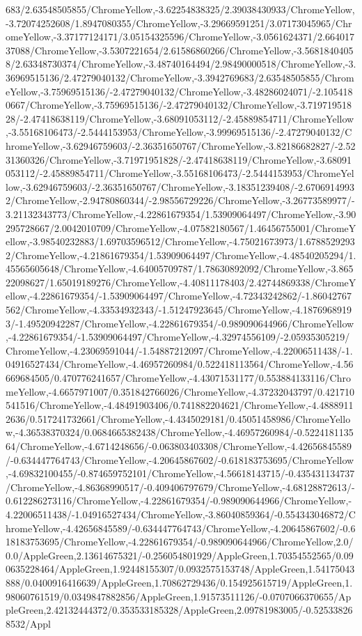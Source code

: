 {\begin{tikzternal}
683/2.63548505855/ChromeYellow,-3.62254838325/2.39038430933/ChromeYellow,-3.72074252608/1.8947080355/ChromeYellow,-3.29669591251/3.07173045965/ChromeYellow,-3.37177124171/3.05154325596/ChromeYellow,-3.0561624371/2.66401737088/ChromeYellow,-3.5307221654/2.61586860266/ChromeYellow,-3.56818404058/2.63348730374/ChromeYellow,-3.48740164494/2.98490000518/ChromeYellow,-3.36969515136/2.47279040132/ChromeYellow,-3.3942769683/2.63548505855/ChromeYellow,-3.75969515136/-2.47279040132/ChromeYellow,-3.48286024071/-2.1054180667/ChromeYellow,-3.75969515136/-2.47279040132/ChromeYellow,-3.71971951828/-2.47418638119/ChromeYellow,-3.68091053112/-2.45889854711/ChromeYellow,-3.55168106473/-2.5444153953/ChromeYellow,-3.99969515136/-2.47279040132/ChromeYellow,-3.62946759603/-2.36351650767/ChromeYellow,-3.82186682827/-2.5231360326/ChromeYellow,-3.71971951828/-2.47418638119/ChromeYellow,-3.68091053112/-2.45889854711/ChromeYellow,-3.55168106473/-2.5444153953/ChromeYellow,-3.62946759603/-2.36351650767/ChromeYellow,-3.18351239408/-2.67069149932/ChromeYellow,-2.94780860344/-2.98556729226/ChromeYellow,-3.26773589977/-3.21132343773/ChromeYellow,-4.22861679354/1.53909064497/ChromeYellow,-3.90295728667/2.0042010709/ChromeYellow,-4.07582180567/1.46456755001/ChromeYellow,-3.98540232883/1.69703596512/ChromeYellow,-4.75021673973/1.67885292932/ChromeYellow,-4.21861679354/1.53909064497/ChromeYellow,-4.48540205294/1.45565605648/ChromeYellow,-4.64005709787/1.78630892092/ChromeYellow,-3.86522098627/1.65019189276/ChromeYellow,-4.40811178403/2.42744869338/ChromeYellow,-4.22861679354/-1.53909064497/ChromeYellow,-4.72343242862/-1.86042767562/ChromeYellow,-4.33534932343/-1.51247923645/ChromeYellow,-4.18769689193/-1.49520942287/ChromeYellow,-4.22861679354/-0.989090644966/ChromeYellow,-4.22861679354/-1.53909064497/ChromeYellow,-4.32974556109/-2.05935305219/ChromeYellow,-4.23069591044/-1.54887212097/ChromeYellow,-4.22006511438/-1.04916527434/ChromeYellow,-4.46957260984/0.522418113564/ChromeYellow,-4.56669684505/0.470776241657/ChromeYellow,-4.43071531177/0.553884133116/ChromeYellow,-4.6657971007/0.351842766026/ChromeYellow,-4.37232043797/0.421710541516/ChromeYellow,-4.48491903406/0.741882204621/ChromeYellow,-4.48889112636/0.517241732661/ChromeYellow,-4.4345029181/0.45051458986/ChromeYellow,-4.36538370324/0.0684665382438/ChromeYellow,-4.46957260984/-0.522418113564/ChromeYellow,-4.6714248656/-0.063803403308/ChromeYellow,-4.42656845589/-0.634447764743/ChromeYellow,-4.20645867602/-0.618183753695/ChromeYellow,-4.69832100455/-0.874659752101/ChromeYellow,-4.56618143715/-0.435431134737/ChromeYellow,-4.86368990517/-0.409406797679/ChromeYellow,-4.68128872613/-0.612286273116/ChromeYellow,-4.22861679354/-0.989090644966/ChromeYellow,-4.22006511438/-1.04916527434/ChromeYellow,-3.86040859364/-0.554343046872/ChromeYellow,-4.42656845589/-0.634447764743/ChromeYellow,-4.20645867602/-0.618183753695/ChromeYellow,-4.22861679354/-0.989090644966/ChromeYellow,2.0/0.0/AppleGreen,2.13614675321/-0.256054801929/AppleGreen,1.70354552565/0.090635228464/AppleGreen,1.92448155307/0.0932575153748/AppleGreen,1.54175043888/0.0400916416639/AppleGreen,1.70862729436/0.154925615719/AppleGreen,1.98060761519/0.0349847882856/AppleGreen,1.91573511126/-0.0707066370655/AppleGreen,2.42132444372/0.353533185328/AppleGreen,2.09781983005/-0.525338268532/Appl
\end{tikzternal}}
